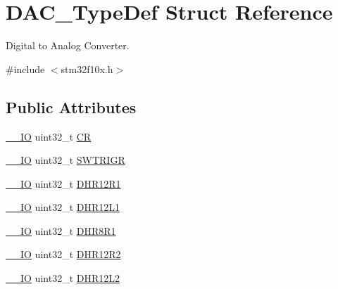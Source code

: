 \hypertarget{struct_d_a_c___type_def}{\section{D\-A\-C\-\_\-\-Type\-Def Struct Reference}
\label{struct_d_a_c___type_def}
}


Digital to Analog Converter.  




{\ttfamily \#include $<$stm32f10x.\-h$>$}

\subsection*{Public Attributes}
\begin{DoxyCompactItemize}
\item 
\hyperlink{group___c_m_s_i_s__core__definitions_gaec43007d9998a0a0e01faede4133d6be}{\-\_\-\-\_\-\-I\-O} uint32\-\_\-t \hyperlink{struct_d_a_c___type_def_a394324f0b573837ca15a87127b2a37ea}{C\-R}
\item 
\hyperlink{group___c_m_s_i_s__core__definitions_gaec43007d9998a0a0e01faede4133d6be}{\-\_\-\-\_\-\-I\-O} uint32\-\_\-t \hyperlink{struct_d_a_c___type_def_a4ccb66068a1ebee1179574dda20206b6}{S\-W\-T\-R\-I\-G\-R}
\item 
\hyperlink{group___c_m_s_i_s__core__definitions_gaec43007d9998a0a0e01faede4133d6be}{\-\_\-\-\_\-\-I\-O} uint32\-\_\-t \hyperlink{struct_d_a_c___type_def_afbfd2855cdb81939b4efc58e08aaf3e5}{D\-H\-R12\-R1}
\item 
\hyperlink{group___c_m_s_i_s__core__definitions_gaec43007d9998a0a0e01faede4133d6be}{\-\_\-\-\_\-\-I\-O} uint32\-\_\-t \hyperlink{struct_d_a_c___type_def_a5eb63912e39085e3e13d64bdb0cf38bd}{D\-H\-R12\-L1}
\item 
\hyperlink{group___c_m_s_i_s__core__definitions_gaec43007d9998a0a0e01faede4133d6be}{\-\_\-\-\_\-\-I\-O} uint32\-\_\-t \hyperlink{struct_d_a_c___type_def_a3a382d341fb608a04390bacb8c00b0f0}{D\-H\-R8\-R1}
\item 
\hyperlink{group___c_m_s_i_s__core__definitions_gaec43007d9998a0a0e01faede4133d6be}{\-\_\-\-\_\-\-I\-O} uint32\-\_\-t \hyperlink{struct_d_a_c___type_def_ab1f777540c487c26bf27e6fa37a644cc}{D\-H\-R12\-R2}
\item 
\hyperlink{group___c_m_s_i_s__core__definitions_gaec43007d9998a0a0e01faede4133d6be}{\-\_\-\-\_\-\-I\-O} uint32\-\_\-t \hyperlink{struct_d_a_c___type_def_a9f612b6b3e065e810e5a2fb254d6a40b}{D\-H\-R12\-L2}
\item 

\end{DoxyCompactItemize}
